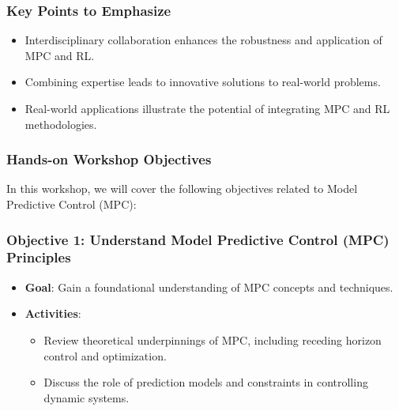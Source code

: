 \documentclass[aspectratio=169]{beamer}
\begin{document}
\begin{frame}[fragile]
    \frametitle{Key Points to Emphasize}
    \begin{itemize}
        \item Interdisciplinary collaboration enhances the robustness and application of MPC and RL.
        \item Combining expertise leads to innovative solutions to real-world problems.
        \item Real-world applications illustrate the potential of integrating MPC and RL methodologies.
    \end{itemize}
\end{frame}

\begin{frame}[fragile]
    \frametitle{Hands-on Workshop Objectives}
    In this workshop, we will cover the following objectives related to Model Predictive Control (MPC):
\end{frame}

\begin{frame}[fragile]
    \frametitle{Objective 1: Understand Model Predictive Control (MPC) Principles}
    \begin{itemize}
        \item \textbf{Goal}: Gain a foundational understanding of MPC concepts and techniques.
        \item \textbf{Activities}:
        \begin{itemize}
            \item Review theoretical underpinnings of MPC, including receding horizon control and optimization.
            \item Discuss the role of prediction models and constraints in controlling dynamic systems.
        \end{itemize}
    \end{itemize}
\end{frame}
\end{document}

